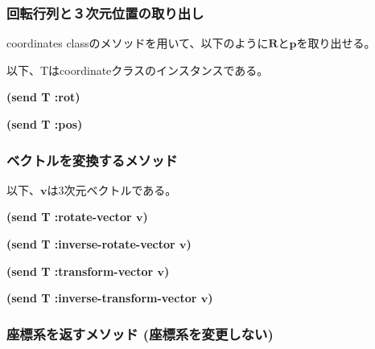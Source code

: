 \subsubsection*{回転行列と３次元位置の取り出し}

coordinates classのメソッドを用いて、以下のように$\mathbf{R}$と$\mathbf{p}$を取り出せる。

以下、Tはcoordinateクラスのインスタンスである。

\begin{refdesc}

{\bf (send T :rot)}

{\bf (send T :pos)}

\end{refdesc}

\subsubsection*{ベクトルを変換するメソッド}

以下、$\mathbf{v}$は3次元ベクトルである。

\begin{refdesc}

{\bf (send T :rotate-vector $\mathbf{v}$)}

{\bf (send T :inverse-rotate-vector $\mathbf{v}$)}

{\bf (send T :transform-vector $\mathbf{v}$)}

{\bf (send T :inverse-transform-vector $\mathbf{v}$)}

\end{refdesc}

\subsubsection*{座標系を返すメソッド (座標系を変更しない)}

